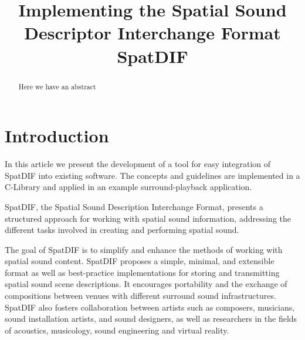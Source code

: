 \documentclass{article}
\title{Implementing the Spatial Sound Descriptor Interchange Format SpatDIF}
\begin{document}
%

\makeatletter 
\def\ps@myheadings{%
\let\ps@jpl@in\ps@plain%
\def\@evenhead{\reset@font\hfil\leftmark\hfil}%
\def\@oddhead{\reset@font\hfil\rightmark\hfil}%
\let\@mkboth\@gobbletwo%
\let\sectionmark\@gobble%
\let\subsectionmark\@gobble%
% 
\def\@oddfoot{\reset@font\hfil-- \thepage --\hfil}%
\let\@evenfoot\@oddfoot 
} 
\makeatother 
\setcounter{page}{17} 
\pagestyle{myheadings} 
\maketitle
\thispagestyle{myheadings}

\begin{abstract}

Here we have an abstract

\end{abstract}


\section{Introduction}

In this article we present the development of a tool for easy integration of SpatDIF into existing software.
The concepts and guidelines are implemented in a C-Library and applied in an example surround-playback application.

SpatDIF, the Spatial Sound Description Interchange Format, presents a structured approach for working with spatial sound information, addressing the different tasks involved in creating and performing spatial sound.

The goal of SpatDIF is to simplify and enhance the methods of working with spatial sound content. 
SpatDIF proposes a simple, minimal, and extensible format as well as best-practice implementations for storing and transmitting spatial sound scene descriptions. 
It encourages portability and the exchange of compositions between venues with different surround sound infrastructures. 
SpatDIF also fosters collaboration between artists such as composers, musicians, sound installation artists, and sound designers, as well as researchers in the fields of acoustics, musicology, sound engineering and virtual reality.
\end{document}
